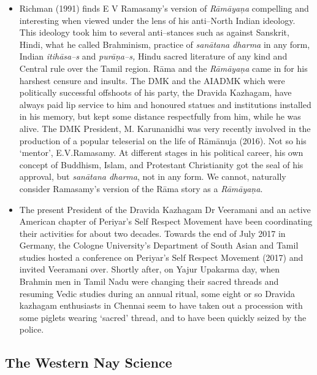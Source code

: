 \begin{itemize}
 \item Richman (1991) finds E V Ramasamy’s version of \textit{Rāmāyaņa} compelling and interesting when viewed under the lens of his anti–North Indian ideology. This ideology took him to several anti–stances such as against Sanskrit, Hindi, what he called Brahminism, practice of \textit{sanātana dharma} in any form, Indian \textit{itihāsa–s} and \textit{purāṇa–s,} Hindu sacred literature of any kind and Central rule over the Tamil region. Rāma and the \textit{Rāmāyaṇa} came in for his harshest censure and insults. The DMK and the AIADMK which were politically successful offshoots of his party, the Dravida Kazhagam, have always paid lip service to him and honoured statues and institutions installed in his memory, but kept some distance respectfully from him, while he was alive. The DMK President, M. Karunanidhi was very recently involved in the production of a popular teleserial on the life of Rāmānuja (2016). Not so his ‘mentor’, E.V.Ramasamy. At different stages in his political career, his own concept of Buddhism, Islam, and Protestant Christianity got the seal of his approval, but \textit{sanātana dharma}, not in any form. We cannot, naturally consider Ramasamy’s version of the Rāma story as a \textit{Rāmāyaṇa}.

 \item The present President of the Dravida Kazhagam Dr Veeramani and an active American chapter of Periyar’s Self Respect Movement have been coordinating their activities for about two decades. Towards the end of July 2017 in Germany, the Cologne University’s Department of South Asian and Tamil studies hosted a conference on Periyar’s Self Respect Movement (2017) and invited Veeramani over. Shortly after, on Yajur Upakarma day, when Brahmin men in Tamil Nadu were changing their sacred threads and resuming Vedic studies during an annual ritual, some eight or so Dravida kazhagam enthusiasts in Chennai seem to have taken out a procession with some piglets wearing ‘sacred’ thread, and to have been quickly seized by the police.

\end{itemize}

\newpage

\subsection*{The Western Nay Science}

